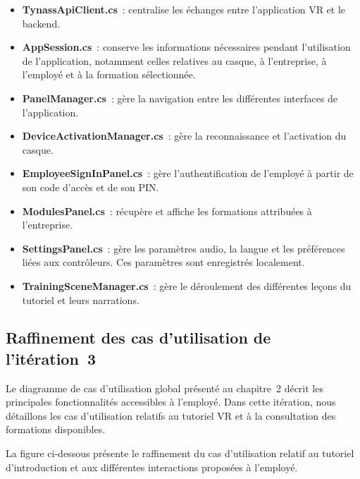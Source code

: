 \begin{itemize}

  \item \textbf{TynassApiClient.cs}~: centralise les échanges entre
    l'application VR et le backend.

  \item \textbf{AppSession.cs}~: conserve les informations nécessaires
    pendant l'utilisation de l'application, notamment celles relatives
    au casque, à l'entreprise, à l'employé et à la formation sélectionnée.

  \item \textbf{PanelManager.cs}~: gère la navigation entre les différentes
    interfaces de l'application.

  \item \textbf{DeviceActivationManager.cs}~: gère la reconnaissance et
    l'activation du casque.

  \item \textbf{EmployeeSignInPanel.cs}~: gère l'authentification de
    l'employé à partir de son code d'accès et de son PIN.

  \item \textbf{ModulesPanel.cs}~: récupère et affiche les formations
    attribuées à l'entreprise.

  \item \textbf{SettingsPanel.cs}~: gère les paramètres audio, la langue
    et les préférences liées aux contrôleurs. Ces paramètres sont
    enregistrés localement.

  \item \textbf{TrainingSceneManager.cs}~: gère le déroulement des
    différentes leçons du tutoriel et leurs narrations.

\end{itemize}

\subsection{Raffinement des cas d'utilisation de l'itération~3}

Le diagramme de cas d'utilisation global présenté au chapitre~2 décrit les
principales fonctionnalités accessibles à l'employé. Dans cette itération,
nous détaillons les cas d'utilisation relatifs au tutoriel VR et à la
consultation des formations disponibles.

La figure ci-dessous présente le raffinement du cas d'utilisation relatif
au tutoriel d'introduction et aux différentes interactions proposées à l'employé.

